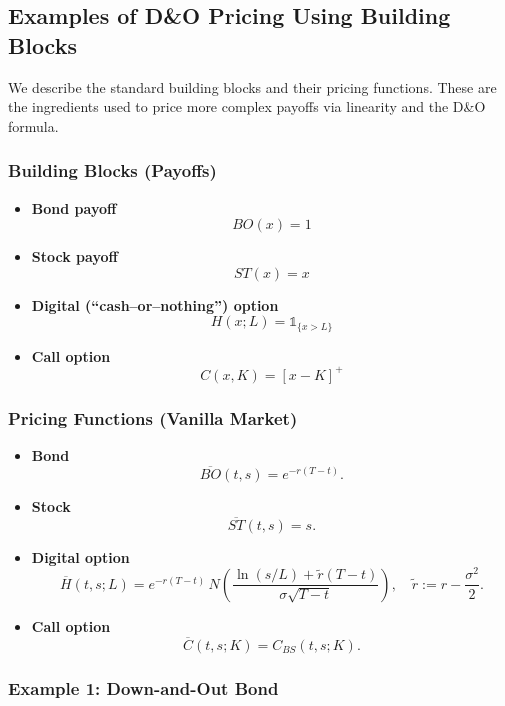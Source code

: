 \documentclass[12pt,a4paper]{article}
\theoremstyle{definition}
\begin{document}
\subsection{Examples of D\&O Pricing Using Building Blocks}

We describe the standard building blocks and their pricing functions. These are the ingredients used to price more complex payoffs via linearity and the D\&O formula.

\subsubsection{Building Blocks (Payoffs)}

\begin{itemize}
\item \textbf{Bond payoff}
\[
BO(x) = 1
\]

\item \textbf{Stock payoff}
\[
ST(x) = x
\]

\item \textbf{Digital (``cash--or--nothing'') option}
\[
H(x; L) = \mathds{1}_{\{x > L\}}
\]

\item \textbf{Call option}
\[
C(x, K) = [x - K]^+
\]
\end{itemize}

\subsubsection{Pricing Functions (Vanilla Market)}

\begin{itemize}
\item \textbf{Bond}
\[
\overline{BO}(t, s) = e^{-r(T-t)}.
\]

\item \textbf{Stock}
\[
\overline{ST}(t, s) = s.
\]

\item \textbf{Digital option}
\[
\overline{H}(t, s; L) = e^{-r(T-t)}\, N\!\left(\frac{\ln(s/L) + \widetilde{r}(T-t)}{\sigma\sqrt{T-t}}\right), \quad \widetilde{r} := r - \frac{\sigma^2}{2}.
\]

\item \textbf{Call option}
\[
\overline{C}(t, s; K) = C_{BS}(t, s; K).
\]
\end{itemize}

\subsubsection{Example 1: Down-and-Out Bond}
\end{document}
